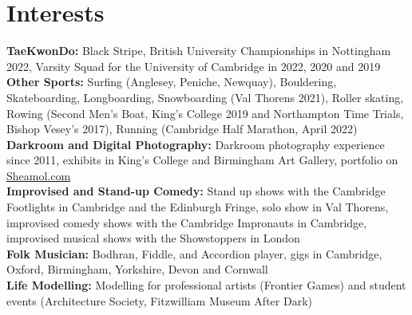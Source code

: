 \documentclass[8pt]{article}
\begin{document}
\section*{Interests}
\textbf{TaeKwonDo:} Black Stripe, British University Championships in Nottingham 2022, Varsity Squad for the University of Cambridge in 2022, 2020 and 2019\\
\textbf{Other Sports:} Surfing (Anglesey, Peniche, Newquay), Bouldering, Skateboarding, Longboarding, Snowboarding (Val Thorens 2021), Roller skating, Rowing (Second Men's Boat, King's College 2019 and Northampton Time Trials, Bishop Vesey's 2017), Running (Cambridge Half Marathon, April 2022)\\
\textbf{Darkroom and Digital Photography:} Darkroom photography experience since 2011,  exhibits in King's College and Birmingham Art Gallery, portfolio on \href{www.sheamol.com}{Sheamol.com}\\
\textbf{Improvised and Stand-up Comedy:} Stand up shows with the Cambridge Footlights in Cambridge and the Edinburgh Fringe, solo show in Val Thorens, improvised comedy shows with the Cambridge Impronauts in Cambridge, improvised musical shows with the Showstoppers in London \\
\textbf{Folk Musician:} Bodhran, Fiddle, and Accordion %
player, gigs in Cambridge, Oxford, Birmingham, Yorkshire, Devon and Cornwall \\ %
\textbf{Life Modelling:} Modelling for professional artists (Frontier Games) and student events (Architecture Society, Fitzwilliam Museum After Dark)\medskip

\vspace{-.75\baselineskip}
\hrulefill
\vspace{-.75\baselineskip}
\end{document}
